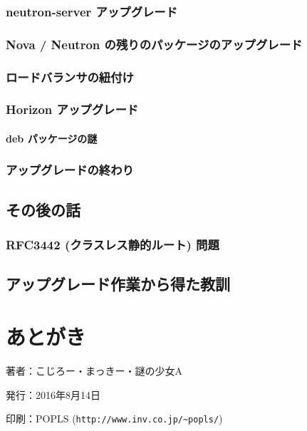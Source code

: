 \documentclass[9pt,b5paper,tombo,openany]{jsbook}
\begin{document}
\subsection{neutron-server アップグレード}
\subsection{Nova / Neutron の残りのパッケージのアップグレード}
\subsection{ロードバランサの紐付け}
\subsection{Horizon アップグレード}
\subsubsection{deb パッケージの謎}
\subsection{アップグレードの終わり}

\section{その後の話}
\subsection{RFC3442 (クラスレス静的ルート) 問題}

\section{アップグレード作業から得た教訓}

\chapter{あとがき}

\thispagestyle{empty}
\begin{flushright}
\begin{minipage}{0.5\hsize}
\begin{description}
  \item{著者：}こじろー・まっきー・謎の少女A
  \item{発行：}2016年8月14日
  \item{印刷：}POPLS (\verb|http://www.inv.co.jp/~popls/|)
\end{description}
\end{minipage}
\end{flushright}
\end{document}
